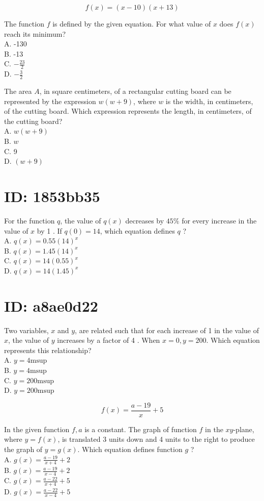 $$
f(x)=(x-10)(x+13)
$$

The function $f$ is defined by the given equation. For what value of $x$ does $f(x)$ reach its minimum?\\
A. -130\\
B. -13\\
C. $-\frac{23}{2}$\\
D. $-\frac{3}{2}$

The area $A$, in square centimeters, of a rectangular cutting board can be represented by the expression $w(w+9)$, where $w$ is the width, in centimeters, of the cutting board. Which expression represents the length, in centimeters, of the cutting board?\\
A. $w(w+9)$\\
B. $w$\\
C. 9\\
D. $(w+9)$

\section*{ID: 1853bb35}
For the function $q$, the value of $q(x)$ decreases by $45 \%$ for every increase in the value of $x$ by 1 . If $q(0)=14$, which equation defines $q$ ?\\
A. $q(x)=0.55(14)^{x}$\\
B. $q(x)=1.45(14)^{x}$\\
C. $q(x)=14(0.55)^{x}$\\
D. $q(x)=14(1.45)^{x}$

\section*{ID: a8ae0d22}
Two variables, $x$ and $y$, are related such that for each increase of 1 in the value of $x$, the value of $y$ increases by a factor of 4 . When $x=0, y=200$. Which equation represents this relationship?\\
A. $y=4 \mathrm{msup}$\\
B. $y=4 \mathrm{msup}$\\
C. $y=200 \mathrm{msup}$\\
D. $y=200 \mathrm{msup}$

$$
f(x)=\frac{a-19}{x}+5
$$

In the given function $f, a$ is a constant. The graph of function $f$ in the $x y$-plane, where $y=f(x)$, is translated 3 units down and 4 units to the right to produce the graph of $y=g(x)$. Which equation defines function $g$ ?\\
A. $g(x)=\frac{a-19}{x+4}+2$\\
B. $g(x)=\frac{a-19}{x-4}+2$\\
C. $g(x)=\frac{a-22}{x+4}+5$\\
D. $g(x)=\frac{a-22}{x-4}+5$

